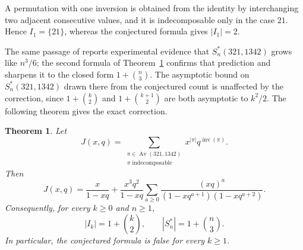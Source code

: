 \documentclass[11pt]{amsart}
\newtheorem{theorem}{Theorem}
\newcommand{\Av}{\operatorname{Av}}
\newcommand{\inv}{\operatorname{inv}}
\begin{document}
A permutation with one inversion is obtained from the identity by
interchanging two adjacent consecutive values, and it is indecomposable
only in the case $21$. Hence $I_1=\{21\}$, whereas the conjectured
formula gives $|I_1|=2$.

The same passage of \cite{Franklin2025} reports experimental evidence
that $S_n^*(321,1342)$ grows like $n^3/6$; the second formula of
Theorem~\ref{thm:main} confirms that prediction and sharpens it to the
closed form $1+\binom{n}{3}$. The asymptotic bound on $S_n^*(321,1342)$
drawn there from the conjectured count is unaffected by the correction,
since $1+\binom{k}{2}$ and $1+\binom{k+1}{2}$ are both asymptotic to
$k^2/2$. The following theorem gives the exact correction.

\begin{theorem}\label{thm:main}
Let
\[
J(x,q)=
\sum_{\substack{\pi\in\Av(321,1342)\\
                 \pi\text{ indecomposable}}}
x^{|\pi|}q^{\inv(\pi)}.
\]
Then
\begin{equation}\label{eq:J}
J(x,q)
=
\frac{x}{1-xq}
+
\frac{x^3q^2}{1-xq}
\sum_{a\ge0}
\frac{(xq)^a}
     {(1-xq^{a+1})(1-xq^{a+2})}.
\end{equation}
Consequently, for every $k\ge0$ and $n\ge1$,
\[
|I_k|=1+\binom{k}{2},
\qquad
|S_n^*|=1+\binom{n}{3}.
\]
In particular, the conjectured formula is false for every $k\ge1$.
\end{theorem}
\end{document}
